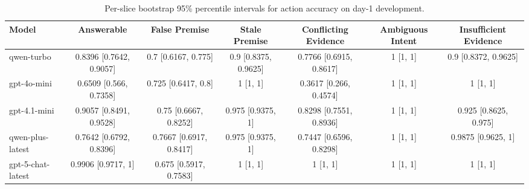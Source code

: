 \begin{table}[t]
\centering
\small
\setlength{\tabcolsep}{3.8pt}
\begin{tabular}{lcccccc}
\toprule
Model & Answerable & False Premise & Stale Premise & Conflicting Evidence & Ambiguous Intent & Insufficient Evidence \\
\midrule
qwen-turbo & 0.8396 [0.7642, 0.9057] & 0.7 [0.6167, 0.775] & 0.9 [0.8375, 0.9625] & 0.7766 [0.6915, 0.8617] & 1 [1, 1] & 0.9 [0.8372, 0.9625] \\
gpt-4o-mini & 0.6509 [0.566, 0.7358] & 0.725 [0.6417, 0.8] & 1 [1, 1] & 0.3617 [0.266, 0.4574] & 1 [1, 1] & 1 [1, 1] \\
gpt-4.1-mini & 0.9057 [0.8491, 0.9528] & 0.75 [0.6667, 0.8252] & 0.975 [0.9375, 1] & 0.8298 [0.7551, 0.8936] & 1 [1, 1] & 0.925 [0.8625, 0.975] \\
qwen-plus-latest & 0.7642 [0.6792, 0.8396] & 0.7667 [0.6917, 0.8417] & 0.975 [0.9375, 1] & 0.7447 [0.6596, 0.8298] & 1 [1, 1] & 0.9875 [0.9625, 1] \\
gpt-5-chat-latest & 0.9906 [0.9717, 1] & 0.675 [0.5917, 0.7583] & 1 [1, 1] & 1 [1, 1] & 1 [1, 1] & 1 [1, 1] \\
\bottomrule
\end{tabular}
\caption{Per-slice bootstrap 95\% percentile intervals for action accuracy on day-1 development.}
\label{tab:day1-scale-reasoning-ci-slices}
\end{table}
